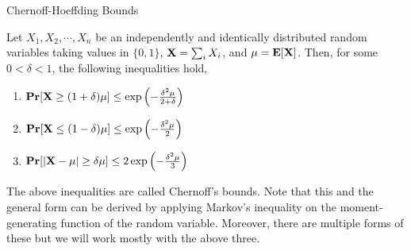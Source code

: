 \begin{frame}{Chernoff-Hoeffding Bounds}
    
    \begin{theorem}
        Let $X_1, X_2, \cdots, X_n$ be an independently and identically distributed random variables taking values in $\lbrace 0, 1 \rbrace$, $\bold{X} = \sum_i X_i$, and $\mu = \mathbb{\mathbf{E}}[\bold{X}]$. Then, for some $0 < \delta < 1$, the following inequalities hold,

        \begin{enumerate}
            \item $\textbf{Pr}[\bold{X} \geq (1 + \delta)\mu] \leq \exp\left(-\frac{\delta^2 \mu}{2 + \delta}\right)$
            \item $\textbf{Pr}[\bold{X} \leq (1 - \delta)\mu] \leq \exp\left(-\frac{\delta^2 \mu}{2}\right)$
            \item $\textbf{Pr}[|\bold{X} - \mu| \geq \delta \mu ] \leq 2\exp\left(-\frac{\delta^2 \mu}{3}\right)$
        \end{enumerate}
    \end{theorem}
    The above inequalities are called Chernoff's bounds. Note that this and the general form can be derived by applying Markov's inequality on the moment-generating function of the random variable. Moreover, there are multiple forms of these but we will work mostly with the above three.
\end{frame}

